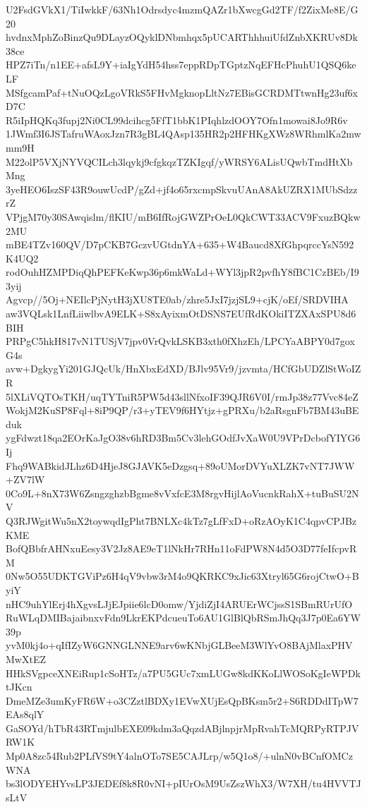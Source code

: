 U2FsdGVkX1/TiIwkkF/63Nh1Odrsdyc4mzmQAZr1bXwcgGd2TF/f2ZixMe8E/G20
hvdnxMphZoBinzQu9DLayzOQyklDNbmhqx5pUCARThhhuiUfdZnbXKRUv8Dk38ce
HPZ7iTn/n1EE+afsL9Y+iaIgYdH54hss7eppRDpTGptzNqEFHcPhuhU1QSQ6keLF
MSfgcamPaf+tNuOQzLgoVRkS5FHvMgknopLltNz7EBisGCRDMTtwnHg23uf6xD7C
R5iIpHQKq3fupj2Ni0CL99dcihcg5FfT1bbK1PIqhlzdOOY7Ofn1mowai8Jo9R6v
1JWmf3I6JSTafruWAoxJzn7R3gBL4QAsp135HR2p2HFHKgXWz8WRhmlKa2mwmm9H
M22olP5VXjNYVQCILch3lqykj9cfgkqzTZKIgqf/yWRSY6ALisUQwbTmdHtXbMng
3yeHEO6IszSF43R9ouwUcdP/gZd+jf4o65rxcmpSkvuUAnA8AkUZRX1MUbSdzzrZ
VPjgM70y30SAwqislm/flKIU/mB6IfRojGWZPrOeL0QkCWT33ACV9FxuzBQkw2MU
mBE4TZv160QV/D7pCKB7GczvUGtdnYA+635+W4Baucd8XfGhpqrccYsN592K4UQ2
rodOuhHZMPDiqQhPEFKeKwp36p6mkWaLd+WYl3jpR2pvfhY8fBC1CzBEb/I93yij
Agvcp//5Oj+NEIlcPjNytH3jXU8TE0ab/zhre5JxI7jzjSL9+cjK/oEf/SRDVIHA
aw3VQLsk1LnfLiiwlbvA9ELK+S8xAyixmOtDSNS7EUfRdKOkiITZXAxSPU8d6BIH
PRPgC5hkH817vN1TUSjV7jpv0VrQvkLSKB3xth0fXhzEh/LPCYaABPY0d7goxG4s
avw+DgkygYi201GJQcUk/HnXbxEdXD/BJlv95Vr9/jzvmta/HCfGbUDZlStWoIZR
5lXLiVQTOsTKH/uqTYTniR5PW5d43sllNfxoIF39QJR6V0I/rmJp38z77Vvc84eZ
WokjM2KuSP8Fql+8iP9QP/r3+yTEV9f6HYtjz+gPRXu/b2aRsgnFb7BM43uBEduk
ygFdwzt18qa2EOrKaJgO38v6hRD3Bm5Cv3lehGOdfJvXaW0U9VPrDcbofYIYG6Ij
Fhq9WABkidJLhz6D4HjeJ8GJAVK5eDzgsq+89oUMorDVYuXLZK7vNT7JWW+ZV7lW
0Co9L+8nX73W6ZsngzghzbBgme8vVxfcE3M8rgvHijlAoVucnkRahX+tuBuSU2NV
Q3RJWgitWu5nX2toywqdIgPht7BNLXc4kTz7gLfFxD+oRzAOyK1C4qpvCPJBzKME
BofQBbfrAHNxuEesy3V2Jz8AE9eT1lNkHr7RHn11oFdPW8N4d5O3D77feIfcpvRM
0Nw5O55UDKTGViPz6H4qV9vbw3rM4o9QKRKC9xJic63Xtryl65G6rojCtwO+ByiY
nHC9uhYlErj4hXgvsLJjEJpiie6lcD0omw/YjdiZjI4ARUErWCjssS1SBmRUrUfO
RuWLqDMIBajaibnxvFdn9LkrEKPdcueuTo6AU1GlBlQbRSmJhQq3J7p0Ea6YW39p
yvM0kj4o+qIfIZyW6GNNGLNNE9arv6wKNbjGLBeeM3WlYvO8BAjMlaxPHVMwXtEZ
HHkSVgpceXNEiRup1cSoHTz/a7PU5GUc7xmLUGw8kdKKoLlWOSoKgIeWPDktJKcn
DmeMZe3umKyFR6W+o3CZztlBDXy1EVwXUjEsQpBKsm5r2+S6RDDdITpW7EAs8qlY
GaSOYd/hTbR43RTmjulbEXE09kdm3aQqzdABjlnpjrMpRvahTcMQRPyRTPJVRW1K
Mp0A8zc54Rub2PLfVS9tY4alnOTo7SE5CAJLrp/w5Q1o8/+ulnN0vBCnfOMCzWNA
bs3lODYEHYvsLP3JEDEf8k8R0vNI+pIUrOsM9UsZszWhX3/W7XH/tu4HVVTJsLtV

